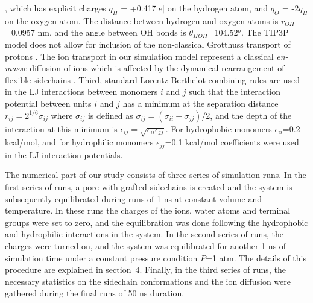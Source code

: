 \documentclass[3p,english,preprint]{elsarticle}
\newcommand{\need}[1]{\textcolor{black}{#1}}
\newcommand{\mage}[1]{\textcolor{black}{#1}}
\begin{document}
\cite{allahyarov-2011-diff-archit,tip5p-tip3p}, which 
has explicit charges  $q_H$ = +0.417$\vert e \vert$ on the hydrogen atom, 
and $q_O$ = -2$q_H$  on the oxygen atom. 
The  distance between hydrogen and oxygen atoms is  $r_{OH}$=0.0957 nm,
 and the angle between OH bonds
is $\theta_{HOH}$=104.52$^o$. The TIP3P model does not allow for inclusion of the 
non-classical Grotthuss transport of protons 
\cite{eikerling-2008,kornyshev-2003,kornyshev-2009-theory-md}. The ion transport 
in our simulation model represent a classical {\it en-masse} diffusion of ions 
which is affected by the dynamical rearrangement of flexible sidechains \cite{thompson-2006}.    
Third, standard Lorentz-Berthelot combining rules are used in the LJ interactions
between monomers $i$ and $j$ such that the interaction potential between units $i$ and $j$  has a minimum at 
the  separation distance $r_{ij}=2^{1/6} \sigma_{ij}$ where  $\sigma_{ij}$ is defined as 
  $\sigma_{ij} = \left( \sigma_{ii} + \sigma_{jj} \right)$/2,  and the depth of the interaction at this minimum 
is $\epsilon_{ij} = \sqrt{ \epsilon_{ii} \epsilon_{jj}}$. 
For hydrophobic monomers $\epsilon_{ii}$=0.2 kcal/mol, and for hydrophilic 
monomers    $\epsilon_{jj}$=0.1 kcal/mol coefficients were used in the LJ interaction 
potentials. 

The numerical part of our study consists of three series of
 simulation runs. In the  first series of runs,  a pore with grafted sidechains is created 
and the system is subsequently  equilibrated during  runs of 1 ns  
 at  constant volume and  temperature. In these runs the
charges of the ions, water atoms and terminal groups were set to zero, and 
the equilibration was  done following the hydrophobic and hydrophilic 
interactions in the system. 
In the second series of runs, the charges were turned on,
and the system was equilibrated for another 1 ns of simulation time 
under a constant pressure condition $P$=1 atm. The details of this procedure 
are explained in section~4. 
Finally, in the third series of runs, 
 the necessary statistics on the sidechain conformations and the ion 
diffusion were gathered during the final  runs of 50 ns duration. 
\end{document}
